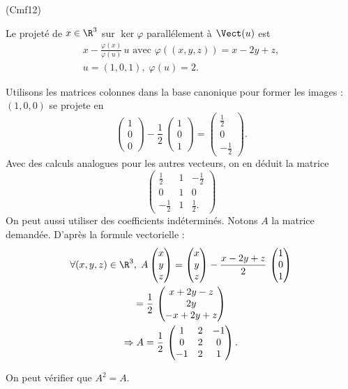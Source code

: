 \begin{tiny}(Cmf12)\end{tiny} Le projeté de $x\in \R^3$ sur $\ker \varphi$ parallélement à $\Vect(u)$ est
\begin{multline*}
 x-\frac{\varphi(x)}{\varphi(u)}\,u \text{ avec } \varphi((x,y,z))= x - 2y + z,\\
 u =(1,0,1), \; \varphi(u) = 2.
\end{multline*}

Utilisons les matrices colonnes dans la base canonique pour former les images : $(1,0,0)$ se projete en
\[
  \begin{pmatrix}
    1 \\ 0 \\ 0
  \end{pmatrix}
- \frac{1}{2}\,\begin{pmatrix}
    1 \\ 0 \\ 1
  \end{pmatrix}
  = \begin{pmatrix}
    \frac{1}{2} \\ 0 \\ -\frac{1}{2}
  \end{pmatrix}.
\]
Avec des calculs analogues pour les autres vecteurs, on en déduit la matrice
\begin{displaymath}
 \begin{pmatrix}
  \frac{1}{2}& 1 & -\frac{1}{2} \\0 & 1 & 0\\ -\frac{1}{2} & 1 & \frac{1}{2}.
 \end{pmatrix}
\end{displaymath}
On peut aussi utiliser des coefficients indéterminés.\newline
Notons $A$ la matrice demandée. D'après la formule vectorielle :
\begin{multline*}
  \forall(x,y,z) \in \R^3,\; 
  A \begin{pmatrix} x \\ y \\ z \end{pmatrix}
  = \begin{pmatrix} x \\ y \\ z \end{pmatrix} - \frac{x - 2y +z}{2}\,\begin{pmatrix} 1 \\ 0 \\ 1 \end{pmatrix} \\
  = \frac{1}{2}\,
  \begin{pmatrix} x + 2y -z \\ 2y \\ -x + 2y +  z \end{pmatrix} \\
  \Rightarrow 
  A = \frac{1}{2}\,
  \begin{pmatrix}
    1 & 2 & -1 \\ 0 & 2 & 0 \\ -1 & 2 & 1
  \end{pmatrix}.
\end{multline*}

On peut vérifier que $A^2 = A$.
